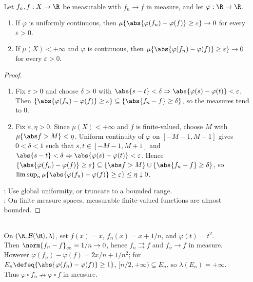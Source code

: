 \begin{proposition} \label{prop:composition-preserves-convergence-in-measure} \\
Let $f_n,f:X\to\R$ be measurable with $f_n\to f$ in measure, and let $\varphi:\R\to\R$.
\begin{enumerate}[label=(\roman*)]
\setlength{\itemsep}{0pt}
\item If $\varphi$ is uniformly continuous, then $\mu\{\abs{\varphi(f_n)-\varphi(f)}\geq\varepsilon\}\to0$ for every $\varepsilon>0$.
\item If $\mu(X)<+\infty$ and $\varphi$ is continuous, then $\mu\{\abs{\varphi(f_n)-\varphi(f)}\geq\varepsilon\}\to0$ for every $\varepsilon>0$.
\end{enumerate}
\begin{proof}
\begin{enumerate}[label=(\roman*)]
\setlength{\itemsep}{0pt}
\item Fix $\varepsilon>0$ and choose $\delta>0$ with $\abs{s-t}<\delta\Rightarrow\abs{\varphi(s)-\varphi(t)}<\varepsilon$.\\
Then $\{\abs{\varphi(f_n)-\varphi(f)}\geq\varepsilon\}\subseteq\{\abs{f_n-f}\geq\delta\}$, so the measures tend to $0$.
\item Fix $\varepsilon,\eta>0$. Since $\mu(X)<+\infty$ and $f$ is finite-valued, choose $M$ with $\mu\{\abs f>M\}<\eta$. Uniform continuity of $\varphi$ on $[-M-1,M+1]$ gives $0<\delta<1$ such that $s,t\in[-M-1,M+1]$ and $\abs{s-t}<\delta\Rightarrow\abs{\varphi(s)-\varphi(t)}<\varepsilon$. Hence $\{\abs{\varphi(f_n)-\varphi(f)}\geq\varepsilon\}\subseteq\{\abs f>M\}\cup\{\abs{f_n-f}\geq\delta\}$, so $\limsup_n\mu\{\abs{\varphi(f_n)-\varphi(f)}\geq\varepsilon\}\leq\eta\downarrow0$.
\end{enumerate}
: Use global uniformity, or truncate to a bounded range.\\
: On finite measure spaces, measurable finite-valued functions are almost bounded.
\end{proof}
\end{proposition}

\begin{example} \label{ex:continuous-composition-in-measure-needs-hypotheses} \\
On $(\R,\mathcal{B}(\R),\lambda)$, set $f(x)=x$, $f_n(x)=x+1/n$, and $\varphi(t)=t^2$.\\
Then $\norm{f_n-f}_\infty=1/n\to0$, hence $f_n\rightrightarrows f$ and $f_n\to f$ in measure.\\
However $\varphi(f_n)-\varphi(f)=2x/n+1/n^2$; for $E_n\defeq\{\abs{\varphi(f_n)-\varphi(f)}\geq1\}$, $[n/2,+\infty)\subseteq E_n$, so $\lambda(E_n)=+\infty$.\\
Thus $\varphi\circ f_n\nrightarrow\varphi\circ f$ in measure.
\end{example}

